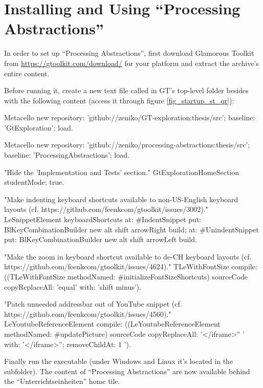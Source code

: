 
\chapter{Installing and Using ``Processing Abstractions''} \label{app_setup}

In order to set up ``Processing Abstractions'', first download Glamorous Toolkit from \url{https://gtoolkit.com/download/} for your platform and extract the archive's entire content.

Before running it, create a new text file called  in \ac{GT}'s top-level folder besides  with the following content (access it through figure \ref{fig_startup_st_qr}):

\begin{code}
Metacello new
	repository: 'github://zeniko/\ac{GT}-exploration:thesis/src';
	baseline: 'GtExploration';
	load.

Metacello new
	repository: 'github://zeniko/processing-abstractions:thesis/src';
	baseline: 'ProcessingAbstractions';
	load.

"Hide the 'Implementation and Tests' section."
GtExplorationHomeSection studentMode: true.

"Make indenting keyboard shortcuts available to non-US-English keyboard layouts
(cf. https://github.com/feenkcom/gtoolkit/issues/3002)."
LeSnippetElement keyboardShortcuts
	at: #IndentSnippet
		put: BlKeyCombinationBuilder new alt shift arrowRight build;
	at: #UnindentSnippet
		put: BlKeyCombinationBuilder new alt shift arrowLeft build.

"Make the zoom in keyboard shortcut available to de-CH keyboard layouts
(cf. https://github.com/feenkcom/gtoolkit/issues/4624)."
TLeWithFontSize compile:
	((TLeWithFontSize methodNamed: #initializeFontSizeShortcuts) sourceCode
		copyReplaceAll: 'equal' with: 'shift minus').

"Patch unneeded addressbar out of YouTube snippet
(cf. https://github.com/feenkcom/gtoolkit/issues/4560)."
LeYoutubeReferenceElement compile:
	((LeYoutubeReferenceElement methodNamed: #updatePicture) sourceCode
		copyReplaceAll: '</iframe>'' ' with: '</iframe>''; removeChildAt: 1 ').
\end{code}

Finally run the  executable (under Windows and Linux it's located in the  subfolder). The content of ``Processing Abstractions'' are now available behind the ``Unterrichtseinheiten'' home tile.

